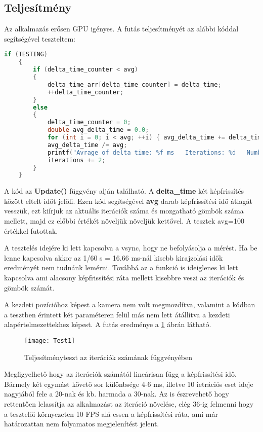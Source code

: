 \subsection{Teljesítmény}

Az alkalmazás erősen GPU igényes.  A futás teljesítményét az alábbi kóddal segítségével teszteltem:
\begin{lstlisting}[language={C++}]
if (TESTING)
	{
		if (delta_time_counter < avg)
		{
			delta_time_arr[delta_time_counter] = delta_time;
			++delta_time_counter;
		}
		else
		{
			delta_time_counter = 0;
			double avg_delta_time = 0.0;
			for (int i = 0; i < avg; ++i) { avg_delta_time += delta_time_arr[i]; }
			avg_delta_time /= avg;
			printf("Avrage of delta time: %f ms   Iterations: %d   Number of spheres: %d \n", avg_delta_time*1000, iterations, ballCount);
			iterations += 2;
		}
	}
\end{lstlisting}

A kód az \textbf{Update()} függvény alján található. A \textbf{delta\_time} két képfrissítés között eltelt időt jelöli. Ezen kód segítségével \textbf{avg} darab képfrissítési idő átlagát vesszük, ezt kiírjuk az aktuális iterációk száma és mozgatható gömbök száma mellett, majd ez előbbi értékét növeljük növeljük kettővel. A tesztek avg=100 értékkel futottak.

A tesztelés idejére ki lett kapcsolva a vsync, hogy ne befolyásolja a mérést. Ha be lenne kapcsolva akkor az 1/60 s = 16.66 ms-nál kisebb kirajzolási idők eredményét nem tudnánk lemérni. Továbbá az a funkció is ideiglenes ki lett kapcsolva ami alacsony képfrissítési ráta mellett kisebbre veszi az iterációk és gömbök számát.

A kezdeti pozícióhoz képest a kamera nem volt megmozdítva, valamint a kódban a tesztben érintett két paraméteren felül más nem lett átállítva a kezdeti alapértelmezettekhez képest. A futás eredménye a \ref{fig:Test1} ábrán látható.

\begin{figure}[H]
	\centering
	\texttt{[image: Test1]}
	\caption{Teljesítményteszt az iterációk számának függvényében}
	\label{fig:Test1}
\end{figure}

Megfigyelhető hogy az iterációk számától lineárisan függ a képfrissítési idő. Bármely két egymást követő sor különbsége 4-6 ms, illetve 10 ietrációs eset ideje nagyjából fele a 20-nak és kb. harmada a 30-nak. Az is észrevehető hogy rettentően lelassítja az alkalmazást az iteráció növelése, elég 36-ig felmenni hogy a tesztelői környezeten 10 FPS alá essen a képfrissítési ráta, ami már határozattan nem folyamatos megjelenítést jelent.

